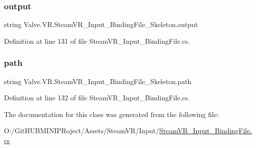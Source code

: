 \subsubsection{\texorpdfstring{output}{output}}
{\footnotesize\ttfamily string Valve.\+V\+R.\+Steam\+V\+R\+\_\+\+Input\+\_\+\+Binding\+File\+\_\+\+Skeleton.\+output}



Definition at line 131 of file Steam\+V\+R\+\_\+\+Input\+\_\+\+Binding\+File.\+cs.

\mbox{\label{class_valve_1_1_v_r_1_1_steam_v_r___input___binding_file___skeleton_a564dea40eb0a4c32e37c065adf257502}} 
\subsubsection{\texorpdfstring{path}{path}}
{\footnotesize\ttfamily string Valve.\+V\+R.\+Steam\+V\+R\+\_\+\+Input\+\_\+\+Binding\+File\+\_\+\+Skeleton.\+path}



Definition at line 132 of file Steam\+V\+R\+\_\+\+Input\+\_\+\+Binding\+File.\+cs.



The documentation for this class was generated from the following file\+:\begin{DoxyCompactItemize}
\item 
O\+:/\+Git\+H\+U\+B\+M\+I\+N\+I\+P\+Roject/\+Assets/\+Steam\+V\+R/\+Input/\mbox{\hyperlink{_steam_v_r___input___binding_file_8cs}{Steam\+V\+R\+\_\+\+Input\+\_\+\+Binding\+File.\+cs}}\end{DoxyCompactItemize}
